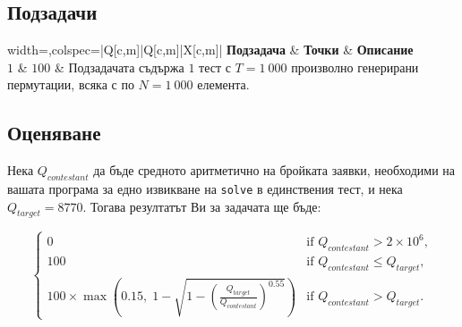 \documentclass[12pt]{article}
\begin{document}
\newpage
\subsection{Подзадачи}
\begin{table}[H]
	\begin{tblr}{width=\linewidth,colspec={|Q[c,m]|Q[c,m]|X[c,m]|}}
		\hline
		\textbf{Подзадача} & \textbf{Точки} & \textbf{Описание}\\
		\hline
		$1$ & $100$ & Подзадачата съдържа $1$ тест с $T=1~000$ произволно генерирани пермутации, всяка с по $N=1~000$ елемента.  \\ 
		\hline
	\end{tblr}
	\caption*{Точките за подзадача се получават само ако се преминат успешно всички тестове предвидени за нея.}
\end{table}
\FloatBarrier

\subsection{Оценяване}

Нека $Q_{contestant}$ да бъде средното аритметично на бройката заявки, необходими на вашата програма за едно извикване на \texttt{solve} в единствения тест, и нека $Q_{target}=8770$. Тогава резултатът Ви за задачата ще бъде:

\[
\begin{cases}
0 & \text{if } Q_{contestant} > 2\times 10^6, \\
100 & \text{if } Q_{contestant} \le Q_{target}, \\
100 \times \max\left(0.15,\; 1-\sqrt{1-\left(\frac{Q_{target}}{Q_{contestant}}\right)^{0.55}}\right) & \text{if } Q_{contestant} > Q_{target}.
\end{cases}
\]
\end{document}
